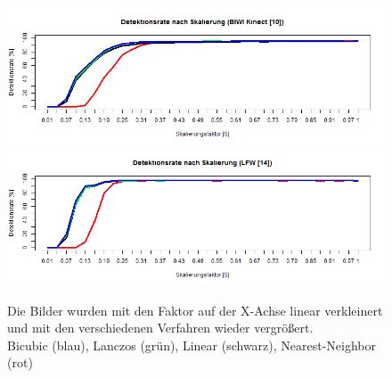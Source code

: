 \begin{figure}
	\centering
	\includegraphics[width=\linewidth]{img_Skalierung/Resize_Rate_Ges}\\
	\includegraphics[width=\linewidth]{img_Skalierung/Resize_Rate_lfw}
	\caption{Die Bilder wurden mit den Faktor auf der X-Achse linear verkleinert und mit den verschiedenen Verfahren wieder vergrößert.\\
		Bicubic (blau), Lanczos (grün), Linear (schwarz), Nearest-Neighbor (rot)}
	\label{img_hochskalliern}
\end{figure}
